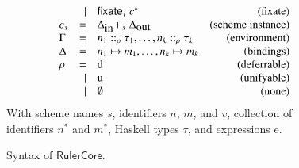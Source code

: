 \documentclass[preprint,natbib]{sigplanconf}
\newcommand\Statement{c}
\newcommand\Statements{\Statement^*}
\newcommand\Bindings{\Delta}
\newcommand\Env{\Gamma}
\newcommand\SchemeName{s}
\newcommand\Type{\tau}
\newcommand\Idents[1]{{#1}^{\!*}}
\newcommand\In{\mbox{in}}
\newcommand\Out{\mbox{out}}
\newcommand\Fixate{\mathsf{fixate}}
\newcommand\Prop{\rho}
\newcommand\Props{\Prop^{*}}
\newcommand\RulerCore{\ensuremath{\mathsf{Ruler Core}}}
\begin{document}
\begin{figure}[htp]
\begin{displaymath}
\begin{array}[t]{lrlr}
                                   &    \mid &   \Fixate_{\Type} \: \Statements                                               & (\mbox{fixate})\\
        \Statement_\SchemeName     &    =    &   \Bindings_{\In} \vdash_\SchemeName \Bindings_{\Out}                          & (\mbox{scheme instance})\\
        \Env                       &    =    &   n_1 ::_{\Prop} \Type_1, \ldots, n_k ::_{\Prop} \Type_k                       & (\mbox{environment})\\
        \Bindings                  &    =    &   n_1 \mapsto m_1, \ldots, n_k \mapsto m_k                                     & (\mbox{bindings})\\
        \Prop                      &    =    &   \mbox{d}                                                                     & (\mbox{deferrable})\\
                                   &    \mid &   \mbox{u}                                                                     & (\mbox{unifyable})\\
                                   &    \mid &   \emptyset                                                                    & (\mbox{none})\\
      \end{array}
    \end{displaymath}
    With scheme names $\SchemeName$, identifiers $n$, $m$, and $v$, collection of identifiers $\Idents{n}$ and $\Idents{m}$, Haskell types $\tau$,
    and expressions e.
    \caption{Syntax of \RulerCore.}
    \label{fig:ruler-core-syntax}
    \end{figure}
\end{document}
